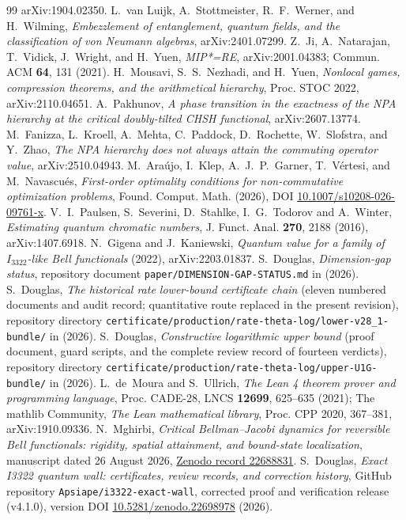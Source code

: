 \documentclass[11pt]{article}
\theoremstyle{remark}
\begin{document}
\begin{thebibliography}{99}
arXiv:1904.02350.
 L.~van Luijk, A.~Stottmeister, R.~F.~Werner, and
H.~Wilming, \emph{Embezzlement of entanglement, quantum fields, and the
classification of von Neumann algebras}, arXiv:2401.07299.
 Z.~Ji, A.~Natarajan, T.~Vidick, J.~Wright, and H.~Yuen,
\emph{MIP*=RE}, arXiv:2001.04383; Commun. ACM \textbf{64}, 131 (2021).
 H.~Mousavi, S.~S.~Nezhadi, and H.~Yuen, \emph{Nonlocal
games, compression theorems, and the arithmetical hierarchy}, Proc. STOC
2022, arXiv:2110.04651.
 A.~Pakhunov, \emph{A phase transition in the exactness
of the NPA hierarchy at the critical doubly-tilted CHSH functional},
arXiv:2607.13774.
 M.~Fanizza, L.~Kroell, A.~Mehta, C.~Paddock,
D.~Rochette, W.~Slofstra, and Y.~Zhao, \emph{The NPA hierarchy does not
always attain the commuting operator value}, arXiv:2510.04943.
 M.~Ara\'ujo, I.~Klep, A.~J.~P.~Garner, T.~V\'ertesi, and
M.~Navascu\'es, \emph{First-order optimality conditions for
non-commutative optimization problems}, Found. Comput. Math. (2026),
DOI \href{https://doi.org/10.1007/s10208-026-09761-x}{10.1007/s10208-026-09761-x}.
 V.~I.~Paulsen, S.~Severini, D.~Stahlke, I.~G.~Todorov and
A.~Winter, \emph{Estimating quantum chromatic numbers}, J. Funct. Anal.
\textbf{270}, 2188 (2016), arXiv:1407.6918.
 N.~Gigena and J.~Kaniewski, \emph{Quantum value
for a family of $I_{3322}$-like Bell functionals} (2022),
arXiv:2203.01837.
 S.~Douglas, \emph{Dimension-gap status}, repository
document \texttt{paper/DIMENSION-GAP-STATUS.md} in \cite{Repo} (2026).
 S.~Douglas, \emph{The historical rate lower-bound certificate chain}
(eleven numbered documents and audit record; quantitative route replaced
in the present revision), repository directory
\texttt{certificate/production/rate-theta-log/lower-v28\_1-bundle/} in
\cite{Repo} (2026).
 S.~Douglas, \emph{Constructive logarithmic upper bound}
(proof document, guard scripts, and the complete review record of fourteen
verdicts), repository directory
\texttt{certificate/production/rate-theta-log/upper-U1G-bundle/} in
\cite{Repo} (2026).
 L.~de~Moura and S.~Ullrich, \emph{The Lean 4 theorem
prover and programming language}, Proc. CADE-28, LNCS \textbf{12699},
625--635 (2021); The mathlib Community, \emph{The Lean mathematical
library}, Proc. CPP 2020, 367--381, arXiv:1910.09336.
 N.~Mghirbi,
\emph{Critical Bellman--Jacobi dynamics for reversible Bell functionals:
rigidity, spatial attainment, and bound-state localization},
manuscript dated 26 August 2026,
\href{https://zenodo.org/records/22688831}{Zenodo record 22688831}.
 S.~Douglas, \emph{Exact I3322 quantum wall: certificates,
review records, and correction history}, GitHub repository
\texttt{Apsiape/i3322-exact-wall}, corrected proof and verification release (v4.1.0),
version DOI
\href{https://doi.org/10.5281/zenodo.22698978}{10.5281/zenodo.22698978}
(2026).
\end{thebibliography}
\end{document}
